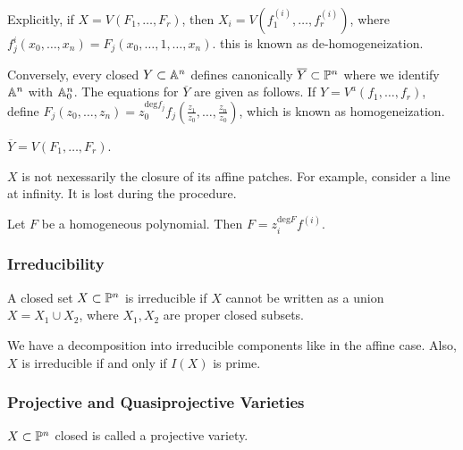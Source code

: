 \documentclass[twoside, 10pt]{article}
\begin{document}
    Explicitly, if $X = V(F_1, \ldots, F_r)$, then $X_i = V(f_1^{(i)}, \ldots, f_r^{(i)})$, where $f_j^{i}(x_0, \ldots, x_n) = F_j(x_0, \ldots, 1, \ldots, x_n)$. this is known as de-homogeneization.

    Conversely, every closed $Y \subset \A^n$ defines canonically $\overline{Y} \subset \P^n$ where we identify $\A^n$ with $\A_0^n$. The equations for $\overline{Y}$ are given as follows. If $Y = V^a(f_1, \ldots, f_r)$, define $F_j(z_0, \ldots, z_n) = z_0^{\mathrm{deg} f_j} f_j \left( \frac{z_1}{z_0}, \ldots, \frac{z_n}{z_0} \right)$, which is known as homogeneization. 

    \begin{prop}
        $\overline{Y} = V(F_1, \ldots, F_r)$.
    \end{prop}

    \begin{rmk}
        $X$ is not nexessarily the closure of its affine patches. For example, consider a line at infinity. It is lost during the procedure.
    \end{rmk}

    \begin{rmk}
        Let $F$ be a homogeneous polynomial. Then $F = z_i^{\mathrm{deg} F} f^{(i)}$.
    \end{rmk}

    \subsubsection{Irreducibility}
    \begin{defn}
        A closed set $X \subset \P^n$ is irreducible if $X$ cannot be written as a union $X = X_1 \cup X_2$, where $X_1, X_2$ are proper closed subsets.
    \end{defn}

    \begin{rmk}
        We have a decomposition into irreducible components like in the affine case. Also, $X$ is irreducible if and only if $I(X)$ is prime.
    \end{rmk}

    \subsubsection{Projective and Quasiprojective Varieties}
    \begin{defn}
        $X \subset \P^n$ closed is called a projective variety.
    \end{defn}
\end{document}
